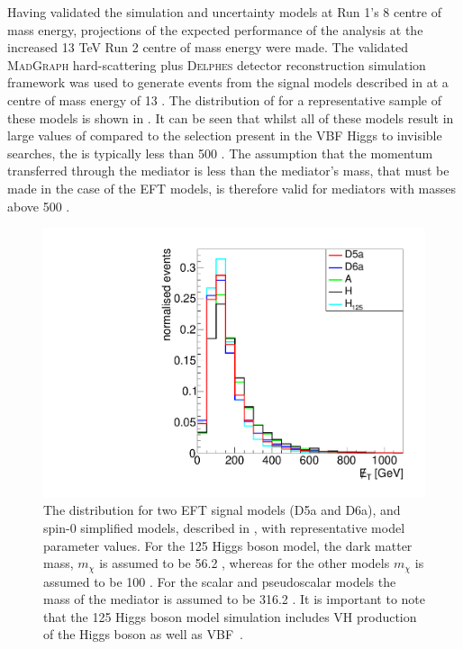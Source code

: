 Having validated the simulation and uncertainty models at Run 1's 8 \TeV centre of mass energy, projections of the expected performance of the analysis at the increased 13 TeV Run 2 centre of mass energy were made. The validated \textsc{MadGraph} hard-scattering plus \textsc{Delphes} detector reconstruction simulation framework was used to generate events from the signal models described in  at a centre of mass energy of 13 \TeV. The distribution of \MET for a representative sample of these models is shown in . It can be seen that whilst all of these models result in large values of \MET compared to the selection present in the \ac{VBF} Higgs to invisible searches, the \MET is typically less than 500 \GeV. The assumption that the momentum transferred through the mediator is less than the mediator's mass, that must be made in the case of the \ac{EFT} models, is therefore valid for mediators with masses above 500 \GeV.

\begin{figure}
  \includegraphics[width=\largefigwidth]{plots/interp/modelmet.pdf}
  \caption{The \MET distribution for two \ac{EFT} signal models (D5a and D6a), and spin-0 simplified models, described in , with representative model parameter values. For the 125 \GeV Higgs boson model, the dark matter mass, $m_{\chi}$ is assumed to be 56.2 \GeV, whereas for the other models $m_{\chi}$ is assumed to be 100 \GeV . For the scalar and pseudoscalar models the mass of the mediator is assumed to be 316.2 \GeV. It is important to note that the 125 \GeV Higgs boson model simulation includes \ac{VH} production of the Higgs boson as well as \ac{VBF}~\cite{ourdmpaper}.}
  \label{fig:dmmodelkinematics}
\end{figure}


